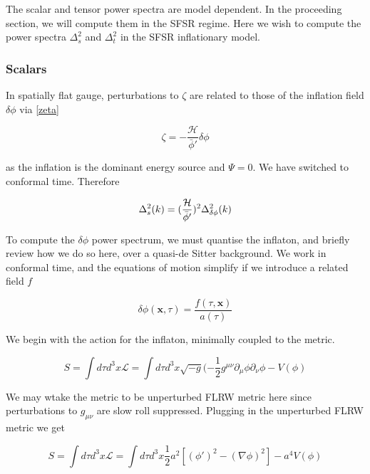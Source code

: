 \documentclass[a4paper,10pt]{article}
\renewcommand{\v}[1]{\mathbf{#1}}
\newcommand{\half}{\frac{1}{2}}
\newcommand{\bphi}{\bar{\phi}}
\begin{document}
The scalar and tensor power spectra are model dependent. In the proceeding section, we will compute them in the SFSR regime. Here we wish to compute the power spectra $\Delta^2_s$ and $\Delta^2_t$ in the SFSR inflationary model. 

\subsubsection{Scalars}

In spatially flat gauge, perturbations to $\zeta$ are related to those of the inflation field $\delta\phi$ via \ref{zeta}

\begin{equation}
\zeta = -\frac{\mathcal{H}}{\bphi'}\delta\phi
\end{equation}

as the inflation is the dominant energy source and $\Psi = 0$. We have switched to conformal time. Therefore

\begin{equation}
\Delta^2_{s}(k) =(\frac{\mathcal{H}}{\bphi'})^2\Delta^2_{\delta\phi}(k)\\
\end{equation}


To compute the $\delta\phi$ power spectrum, we must quantise the inflaton, and briefly review how we do so here, over a quasi-de Sitter background. We work in conformal time, and the equations of motion simplify if we introduce a related field $f$ 

\begin{equation}
\delta\phi(\v{x},\tau) = \frac{f(\tau, \v{x})}{a(\tau)}
\label{phiexpand}
\end{equation}

We begin with the action for the inflaton, minimally coupled to the metric.

\begin{equation}
S =\int d\tau d^3x \mathcal{L}  =  \int d\tau d^3x \sqrt{-g} (-\half g^{\mu \nu}\partial_\mu \phi\partial_\nu \phi - V(\phi)  
\end{equation}

We may wtake the metric to be unperturbed FLRW metric here since perturbations to $g_{\mu\nu}$ are slow roll suppressed. Plugging in the unperturbed FLRW metric we get 

\begin{equation}
S = \int d\tau d^3x \mathcal{L}  = \int d\tau d^3x \half a^2 [(\phi ' )^2 -(\nabla \phi)^2]-a^4V(\phi)
\label{scalarfieldaction}
\end{equation}
\end{document}
